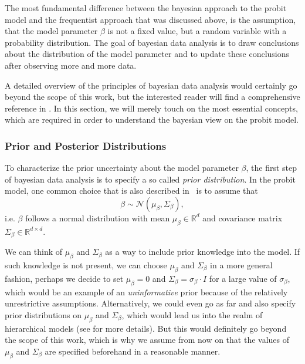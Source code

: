 The most fundamental difference between the bayesian approach to
the probit model and the frequentist approach that was discussed above,
is the assumption, that the model parameter $\beta$ is not a fixed
value, but a random variable with a probability distribution.
The goal of bayesian data analysis is to draw conclusions about
the distribution of the model parameter and to update these
conclusions after observing more and more data.

A detailed overview of the principles of bayesian data
analysis would certainly go beyond the scope of this work,
but the interested reader will find a comprehensive reference
in \cite{bayes-gelman}.
In this section, we will merely touch on the most essential concepts,
which are required in order to understand the bayesian view on the
probit model.

\subsubsection{Prior and Posterior Distributions}

To characterize the prior uncertainty about the model parameter $\beta$,
the first step of bayesian data analysis is to specify a so called
\textit{prior distribution}.
In the probit model, one common choice that is also described
in~\cite{regression-fahrmeir} is to assume that
\begin{equation}
    \beta \sim \mathcal{N}(\mu_\beta, \Sigma_\beta),
\end{equation}
i.e. $\beta$ follows a normal distribution with mean
$\mu_\beta \in \mathbb{R}^d$ and
covariance matrix $\Sigma_\beta \in \mathbb{R}^{d \times d}$.

We can think of $\mu_\beta$ and $\Sigma_\beta$ as a way to
include prior knowledge into the model.
If such knowledge is not present, we can choose $\mu_\beta$ and
$\Sigma_\beta$ in a more general fashion, perhaps we decide
to set $\mu_\beta = 0$ and $\Sigma_\beta = \sigma_\beta \cdot I$
for a large value of $\sigma_\beta$, which would
be an example of an \textit{uninformative} prior because of
the relatively unrestrictive assumptions.
Alternatively, we could even go as far and also specify prior
distributions on $\mu_\beta$ and $\Sigma_\beta$, which would
lead us into the realm of hierarchical models
(see \cite{bayes-gelman} for more details). But this would definitely
go beyond the scope of this work, which is why we assume from
now on that the values of $\mu_\beta$ and $\Sigma_\beta$
are specified beforehand in a reasonable manner.

